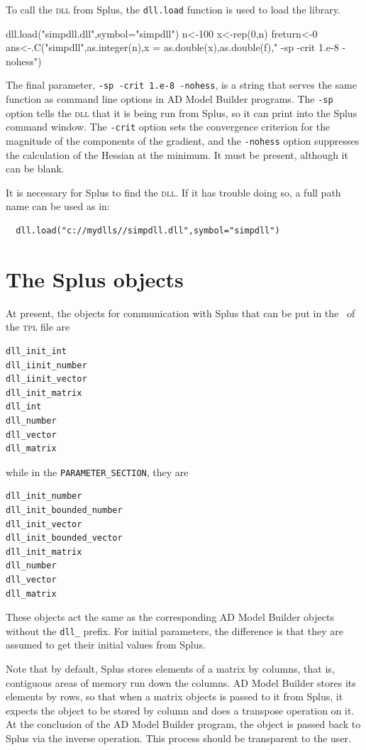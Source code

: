 To call the \textsc{dll} from Splus, the \texttt{dll.load} function is used to
load the library. 
\begin{smallcode}
dll.load("simpdll.dll",symbol="simpdll")
n<-100
x<-rep(0,n)
freturn<-0
ans<-.C("simpdll",as.integer(n),x = as.double(x),as.double(f)," -sp -crit 1.e-8 -nohess")
\end{smallcode}
The final parameter, \texttt{-sp -crit 1.e-8 -nohess}, is a string that serves the same function as command
line options in AD Model Builder programs. 
The \texttt{-sp} option tells the \textsc{dll} that it is being run from Splus, so 
it can print into the Splus command window. The \texttt{-crit} option sets the
convergence criterion for the magnitude of the components of the
gradient, and the \texttt{-nohess} option suppresses the calculation of the 
Hessian at the minimum. It must be present, although it can be blank.

It is necessary for Splus to find the \textsc{dll}. If it has trouble doing so, a full
path name can be used as in:
\begin{lstlisting}
  dll.load("c://mydlls//simpdll.dll",symbol="simpdll")
\end{lstlisting}


\section{The Splus objects}

At present, the objects for communication
with Splus that can be put in the \DS\ of the \textsc{tpl} file are
\begin{lstlisting}
dll_init_int
dll_iinit_number
dll_iinit_vector
dll_init_matrix
dll_int
dll_number
dll_vector
dll_matrix
\end{lstlisting}
while in the \texttt{PARAMETER\_SECTION}, they are
\begin{lstlisting}
dll_init_number
dll_init_bounded_number
dll_init_vector
dll_init_bounded_vector
dll_init_matrix
dll_number
dll_vector
dll_matrix
\end{lstlisting}
These objects act the same as the corresponding AD Model Builder objects
without the \texttt{dll\_} prefix. For initial parameters, the difference is that
they are assumed to get their initial values from Splus.

Note that by default, Splus stores elements of a matrix by columns, that
is, contiguous areas of memory run down the columns. AD Model Builder stores
its elements by rows, so that when a matrix objects is passed to it from
Splus, it expects the object to be stored by column and does a transpose
operation on it. At the conclusion of the AD Model Builder program,
the object is passed back to Splus via the inverse operation. This
process should be transparent to the user. 

